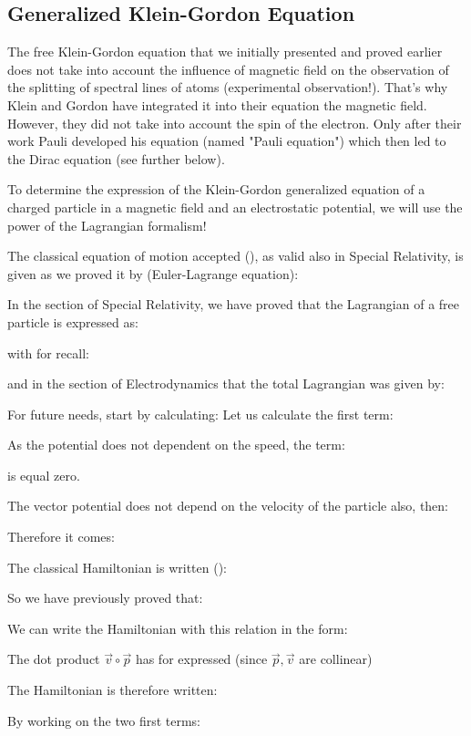 	\subsection{Generalized Klein-Gordon Equation}
	The free Klein-Gordon equation that we initially presented and proved earlier does not take into account the influence of magnetic field on the observation of the splitting of spectral lines of atoms (experimental observation!). That's why Klein and Gordon have integrated it into their equation the magnetic field. However, they did not take into account the spin of the electron. Only after their work Pauli developed his equation (named "Pauli equation") which then led to the Dirac equation (see further below).

	To determine the expression of the Klein-Gordon generalized equation of a charged particle in a magnetic field and an electrostatic potential, we will use the power of the Lagrangian formalism!

	The classical equation of motion accepted (), as valid also in Special Relativity, is given as we proved it by (Euler-Lagrange equation):
	
	In the section of Special Relativity, we have proved that the Lagrangian of a free particle is expressed as:
	
	with for recall:
	
	and in the section of Electrodynamics that the total Lagrangian was given by:
	
	For future needs, start by calculating:
	Let us calculate the first term:
	
	As the potential does not dependent on the speed, the term:
	
	is equal zero.

	The vector potential does not depend on the velocity of the particle also, then:
	
	Therefore it comes:
	
	The classical Hamiltonian is written ():
	
	So we have previously proved that:
	
	We can write the Hamiltonian with this relation in the form:
	
	The dot product $\vec{v}\circ\vec{p}$ has for expressed (since $\vec{p},\vec{v}$ are collinear)
	
	The Hamiltonian is therefore written:
	
	By working on the two first terms:
	
